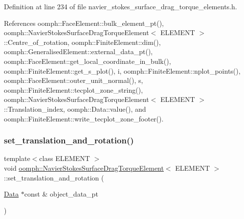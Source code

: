 Definition at line 234 of file navier\+\_\+stokes\+\_\+surface\+\_\+drag\+\_\+torque\+\_\+elements.\+h.



References oomph\+::\+Face\+Element\+::bulk\+\_\+element\+\_\+pt(), oomph\+::\+Navier\+Stokes\+Surface\+Drag\+Torque\+Element$<$ E\+L\+E\+M\+E\+N\+T $>$\+::\+Centre\+\_\+of\+\_\+rotation, oomph\+::\+Finite\+Element\+::dim(), oomph\+::\+Generalised\+Element\+::external\+\_\+data\+\_\+pt(), oomph\+::\+Face\+Element\+::get\+\_\+local\+\_\+coordinate\+\_\+in\+\_\+bulk(), oomph\+::\+Finite\+Element\+::get\+\_\+s\+\_\+plot(), i, oomph\+::\+Finite\+Element\+::nplot\+\_\+points(), oomph\+::\+Face\+Element\+::outer\+\_\+unit\+\_\+normal(), s, oomph\+::\+Finite\+Element\+::tecplot\+\_\+zone\+\_\+string(), oomph\+::\+Navier\+Stokes\+Surface\+Drag\+Torque\+Element$<$ E\+L\+E\+M\+E\+N\+T $>$\+::\+Translation\+\_\+index, oomph\+::\+Data\+::value(), and oomph\+::\+Finite\+Element\+::write\+\_\+tecplot\+\_\+zone\+\_\+footer().

\mbox{\label{classoomph_1_1NavierStokesSurfaceDragTorqueElement_a12dcbd193703aefcd56632bff6c065d8}} 
\subsubsection{\texorpdfstring{set\+\_\+translation\+\_\+and\+\_\+rotation()}{set\_translation\_and\_rotation()}}
{\footnotesize\ttfamily template$<$class E\+L\+E\+M\+E\+NT $>$ \\
void \hyperlink{classoomph_1_1NavierStokesSurfaceDragTorqueElement}{oomph\+::\+Navier\+Stokes\+Surface\+Drag\+Torque\+Element}$<$ E\+L\+E\+M\+E\+NT $>$\+::set\+\_\+translation\+\_\+and\+\_\+rotation (\begin{DoxyParamCaption}\item[{\hyperlink{classoomph_1_1Data}{Data} $\ast$const \&}]{object\+\_\+data\+\_\+pt }\end{DoxyParamCaption})\hspace{0.3cm}{\ttfamily [inline]}}



